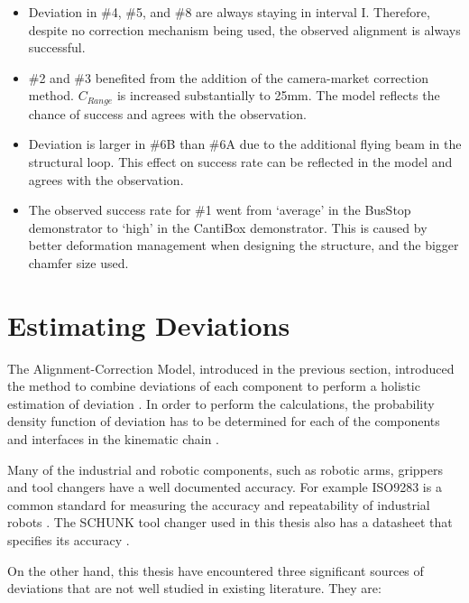 \begin{itemize}
	\item Deviation in \#4, \#5, and \#8 are always staying in interval \textrm{I}. Therefore, despite no correction mechanism being used, the observed alignment is always successful. 

	\item \#2 and \#3 benefited from the addition of the camera-market correction method. $C_{Range}$ is increased substantially to 25mm. The model reflects the chance of success and agrees with the observation.

	\item Deviation is larger in \#6B than \#6A due to the additional flying beam in the structural loop. This effect on success rate can be reflected in the model and agrees with the observation.

	\item The observed success rate for \#1 went from ‘average’ in the BusStop demonstrator to ‘high’ in the CantiBox demonstrator. This is caused by better deformation management when designing the structure, and the bigger chamfer size used. 
\end{itemize}

\clearpage
\section{Estimating Deviations}
\label{section:estimating-deviations}

The Alignment-Correction Model, introduced in the previous section, introduced the method to combine deviations of each component to perform a holistic estimation of deviation . In order to perform the calculations, the probability density function of deviation has to be determined for each of the components and interfaces in the kinematic chain .

Many of the industrial and robotic components, such as robotic arms, grippers and tool changers have a well documented accuracy. For example ISO9283 is a common standard for measuring the accuracy and repeatability of industrial robots \parencite{iso9283:1998ManipulatingIndustrialRobots1998}. The SCHUNK tool changer used in this thesis also has a datasheet that specifies its accuracy \parencite{schunkgmbh&co.kgSWSCatalog2023}. 

On the other hand, this thesis have encountered three significant sources of deviations that are not well studied in existing literature. They are:

